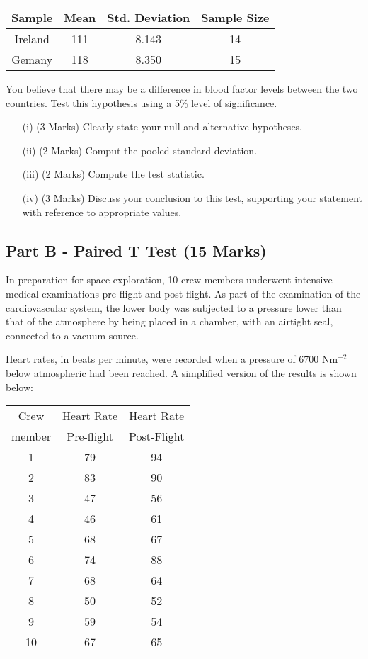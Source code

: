 \documentclass[a4paper,12pt]{article}
\begin{document}
		\begin{center}	
	\begin{tabular}{|c|c|c|c|} \hline 
		Sample & Mean & Std. Deviation & Sample Size \\  \hline 
		Ireland & 111 & 8.143 & 14 \\ \hline 
		Gemany & 118 & 8.350 & 15 \\ \hline
		\end{tabular} 
				\end{center}
You believe that there may be a difference in blood factor levels between the two countries. Test this hypothesis using a 5\% level of significance. 
\begin{itemize}
	\item[(i)](3 Marks) Clearly state your null and alternative hypotheses.

	\item[(ii)] (2 Marks) Comput the pooled standard deviation.
	\item[(iii)](2 Marks) Compute the test statistic.
	\item[(iv)](3 Marks) Discuss your conclusion to this test, supporting your statement with reference to appropriate values.
\end{itemize}				

\subsection*{Part B - Paired T Test (15 Marks)}
In preparation for space exploration, 10 crew members underwent intensive
 medical examinations pre-flight and post-flight. As part of the examination
 of the cardiovascular system, the lower body was subjected to a pressure lower
 than that of the atmosphere by being placed in a chamber, with an airtight
 seal, connected to a vacuum source. \\ \smallskip
 
\noindent Heart rates, in beats per minute, were
 recorded when a pressure of 6700 Nm$^{−2}$ below atmospheric had been reached.
 A simplified version of the results is shown below:
		\begin{center}
			
		
			\begin{tabular}{|c|c|c|} \hline 
	Crew   & Heart Rate & Heart Rate \\
\phantom{spa}	member \phantom{spa}& \phantom{spa}Pre-flight\phantom{spa} & \phantom{spa}Post-Flight \phantom{spa}\\	\hline \hline
		1 & 79 & 94 \\ \hline
		2 & 83 & 90 \\ \hline
		3 & 47 & 56 \\ \hline 
		4 & 46 & 61 \\ \hline
		5 & 68 & 67 \\ \hline 
		6 & 74 & 88 \\ \hline
		7 & 68 & 64 \\ \hline 
		8 & 50 & 52 \\ \hline 
		9 & 59 & 54 \\ \hline 
		10 & 67 & 65 \\ \hline
			\end{tabular} 
		\end{center}
\end{document}
